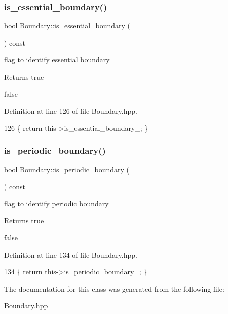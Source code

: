 \subsubsection{\texorpdfstring{is\+\_\+essential\+\_\+boundary()}{is\_essential\_boundary()}}
{\footnotesize\ttfamily bool Boundary\+::is\+\_\+essential\+\_\+boundary (\begin{DoxyParamCaption}{ }\end{DoxyParamCaption}) const}



flag to identify essential boundary 

\begin{DoxyReturn}{Returns}
true 

false 
\end{DoxyReturn}


Definition at line 126 of file Boundary.\+hpp.


\begin{DoxyCode}
126 \{ \textcolor{keywordflow}{return} this->is\_essential\_boundary\_; \}
\end{DoxyCode}
\mbox{\label{classBoundary_a3050c65c13641207ee776309baec08ff}} 
\subsubsection{\texorpdfstring{is\+\_\+periodic\+\_\+boundary()}{is\_periodic\_boundary()}}
{\footnotesize\ttfamily bool Boundary\+::is\+\_\+periodic\+\_\+boundary (\begin{DoxyParamCaption}{ }\end{DoxyParamCaption}) const}



flag to identify periodic boundary 

\begin{DoxyReturn}{Returns}
true 

false 
\end{DoxyReturn}


Definition at line 134 of file Boundary.\+hpp.


\begin{DoxyCode}
134 \{ \textcolor{keywordflow}{return} this->is\_periodic\_boundary\_; \}
\end{DoxyCode}


The documentation for this class was generated from the following file\+:\begin{DoxyCompactItemize}
\item 
Boundary.\+hpp\end{DoxyCompactItemize}
